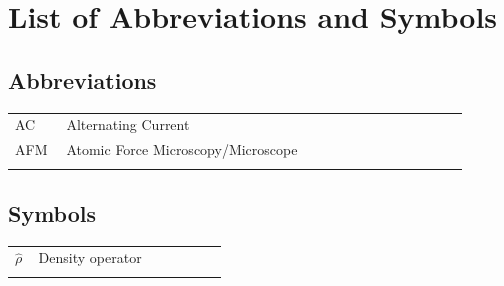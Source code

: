 %

\chapter[List of Abbreviations and Symbols]{List of Abbreviations and Symbols}


\section{Abbreviations}
\noindent
\begin{longtable}{p{0.10\linewidth} p{0.80\linewidth} }
	AC & Alternating Current \\
	AFM	& Atomic Force Microscopy/Microscope \\
	\etc{} & \etc{} \\
\end{longtable}


\section{Symbols}
\noindent
\begin{longtable}{p{0.10\linewidth} p{0.80\linewidth} }
	$\hat{\rho}$ & Density operator \\
	\etc{} & \etc{} \\
\end{longtable}
\clearpage





